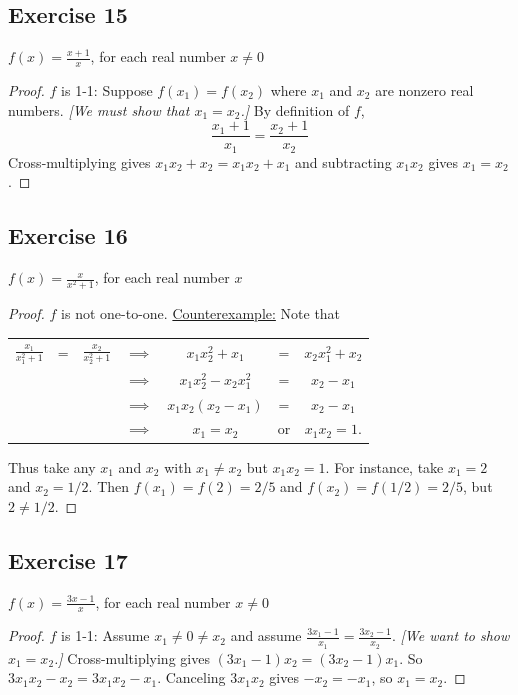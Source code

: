 \documentclass[14pt]{extarticle}
\newcommand{\dps}{\displaystyle}
\begin{document}
\subsection{Exercise 15}
\(\dps f(x) = \frac{x+1}{x}\), for each real number \(x \neq 0\)

\begin{proof}
$f$ is 1-1: Suppose \(f(x_1) = f(x_2)\) where $x_1$ and $x_2$ are nonzero real numbers. {\it [We must show that 
\(x_1 = x_2\).]} By definition of $f$,
\[
\frac{x_1 + 1}{x_1} = \frac{x_2 + 1}{x_2}
\]
Cross-multiplying gives \(x_1x_2 + x_2 = x_1x_2 + x_1\) and subtracting $x_1x_2$ gives \(x_1 = x_2\).
\end{proof}

\subsection{Exercise 16}
\(\dps f(x) = \frac{x}{x^2+1}\), for each real number \(x\)

\begin{proof}
$f$ is not one-to-one. \underline{Counterexample:} Note that

\begin{center}
\begin{tabular}{ccccccc}
\(\dps\frac{x_1}{x_1^2+1}\) & = & \(\dps\frac{x_2}{x_2^2+1}\) & \(\implies\) & \(x_1x_2^2 + x_1\) & = & \(x_2x_1^2 + x_2\)\\
&&&\(\implies\) & \(x_1x_2^2 - x_2x_1^2\) & = & \(x_2-x_1\)\\
&&&\(\implies\) & \(x_1x_2(x_2-x_1)\) & = & \(x_2-x_1\)\\
&&&\(\implies\) & \(x_1 = x_2\) & or & \(x_1x_2 = 1\).
\end{tabular}
\end{center}

Thus take any $x_1$ and $x_2$ with $x_1 \neq x_2$ but $x_1x_2 = 1$. For instance, take 
\(x_1 = 2\) and \(x_2 = 1/2\). Then \(f(x_1) = f(2) = 2/5\) and \(f(x_2) = f(1/2) = 2/5\), but $2 \neq 1/2$.
\end{proof}

\subsection{Exercise 17}
\(\dps f(x) = \frac{3x-1}{x}\), for each real number \(x \neq 0\)

\begin{proof}
$f$ is 1-1: Assume \(x_1 \neq 0 \neq x_2\) and assume \(\frac{3x_1-1}{x_1} = \frac{3x_2-1}{x_2}\).
{\it [We want to show \(x_1 = x_2\).]} Cross-multiplying gives \((3x_1-1)x_2 = (3x_2-1)x_1\). So
\(3x_1x_2 - x_2 = 3x_1x_2 - x_1\). Canceling $3x_1x_2$ gives \(-x_2 = -x_1\), so \(x_1 = x_2\).
\end{proof}
\end{document}
